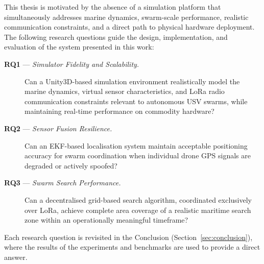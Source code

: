 This thesis is motivated by the absence of a simulation platform that 
simultaneously addresses marine dynamics, swarm-scale performance, 
realistic communication constraints, and a direct path to physical 
hardware deployment. The following research questions guide the design, 
implementation, and evaluation of the system presented in this work:

\begin{description}

    \item[\textbf{RQ1} --- \textit{Simulator Fidelity and Scalability.}]
    Can a Unity3D-based simulation environment realistically model the 
    marine dynamics, virtual sensor characteristics, and LoRa radio 
    communication constraints relevant to autonomous USV swarms, while 
    maintaining real-time performance on commodity hardware?

    \item[\textbf{RQ2} --- \textit{Sensor Fusion Resilience.}]
    Can an EKF-based localisation system maintain acceptable positioning 
    accuracy for swarm coordination when individual drone GPS signals are 
    degraded or actively spoofed?

    \item[\textbf{RQ3} --- \textit{Swarm Search Performance.}]
    Can a decentralised grid-based search algorithm, coordinated 
    exclusively over LoRa, achieve complete area coverage of a realistic 
    maritime search zone within an operationally meaningful timeframe?

\end{description}

Each research question is revisited in the Conclusion 
(Section~\ref{sec:conclusion}), where the results of the experiments 
and benchmarks are used to provide a direct answer.